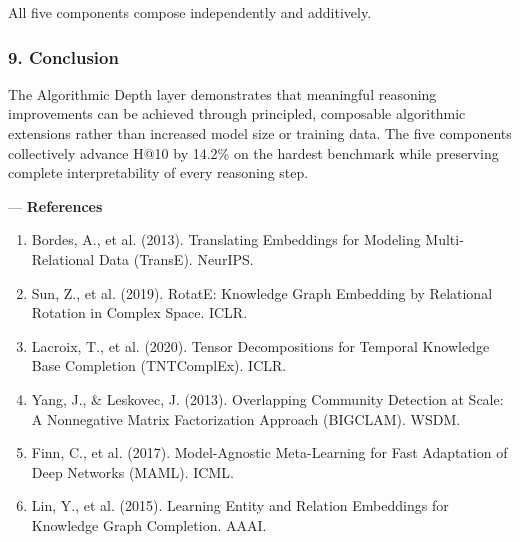 \documentclass[10pt,journal,compsoc]{IEEEtran}
\begin{document}
All five components compose indep\-endently and additively.

\subsubsection{9. Conclusion}
The Algorithmic Depth layer demon\-strates that meaningful reasoning impro\-vements can be achieved through principled, composable algorithmic extensions rather than increased model size or training data. The five components colle\-ctively advance H@10 by 14.2\% on the hardest benchmark while preserving complete inter\-pretability of every reasoning step.

---
\textbf{References}
\begin{enumerate}
\item Bordes, A., et al. (2013). Translating Embeddings for Modeling Multi-Relational Data (TransE). NeurIPS.
\item Sun, Z., et al. (2019). RotatE: Knowledge Graph Embedding by Relational Rotation in Complex Space. ICLR.
\item Lacroix, T., et al. (2020). Tensor Decomp\-ositions for Temporal Knowledge Base Completion (TNTComplEx). ICLR.
\item Yang, J., \& Leskovec, J. (2013). Overlapping Community Detection at Scale: A Nonnegative Matrix Factor\-ization Approach (BIGCLAM). WSDM.
\item Finn, C., et al. (2017). Model-Agnostic Meta-Learning for Fast Adaptation of Deep Networks (MAML). ICML.
\item Lin, Y., et al. (2015). Learning Entity and Relation Embeddings for Knowledge Graph Completion. AAAI.

\end{enumerate}



\end{document}
